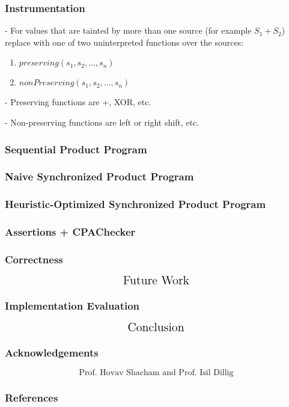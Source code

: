 \documentclass{beamer} %
\theoremstyle{definition} %
\begin{document}
\begin{frame}
\frametitle{Instrumentation}
	
	- For values that are tainted by more than one source (for example $S_1 + S_2$) replace with one of two uninterpreted functions over the sources: \begin{enumerate}
		\item $preserving(s_1, s_2, \ldots, s_n)$
		\item $nonPreserving(s_1, s_2, \ldots, s_n)$
	\end{enumerate}
	
	- Preserving functions are +, XOR, etc.
	
	- Non-preserving functions are left or right shift, etc.

\end{frame}

\begin{frame}
\frametitle{Sequential Product Program}
	
\end{frame}

\begin{frame}
\frametitle{Naive Synchronized Product Program}
	
\end{frame}

\begin{frame}
\frametitle{Heuristic-Optimized Synchronized Product Program}
	
\end{frame}

\begin{frame}
\frametitle{Assertions + CPAChecker}
	
\end{frame}

\begin{frame}
\frametitle{Correctness}
	
\end{frame}

\begin{frame}
	\[\text{\Large{Future Work}}\]
\end{frame}

\begin{frame}
\frametitle{Implementation Evaluation}
	
\end{frame}

\begin{frame}
	\[\text{\Large{Conclusion}}\]
\end{frame}

\begin{frame}
\frametitle{Acknowledgements}
	\[\text{Prof. Hovav Shacham and Prof. Isil Dillig}\]
\end{frame}

\begin{frame}
\frametitle{References}
	
\end{frame}
\end{document}
